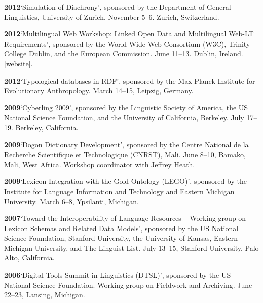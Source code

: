 \documentclass[11pt]{article}
\newcommand{\hangpara}{
 \setlength{\parindent}{0in} %
 \hangindent=0.42in %
}
\begin{document}
\vskip 6pt
\hangpara
{\bf 2012}\hspace{1ex}`Simulation of Diachrony', sponsored by the Department of General Linguistics, University of Zurich. November 5--6. Zurich, Switzerland.

\vskip 6pt
\hangpara
{\bf 2012}\hspace{1ex}`Multilingual Web Workshop: Linked Open Data and Multilingual Web-LT Requirements', sponsored by the World Wide Web Consortium (W3C), Trinity College Dublin, and the European Commission. June 11--13. Dublin, Ireland. \href{https://www.multilingualweb.eu/documents/dublin-workshop/dublin-cfp}{[website]}.

\vskip 6pt
\hangpara
{\bf 2012}\hspace{1ex}`Typological databases in RDF', sponsored by the Max Planck Institute for Evolutionary Anthropology. March 14--15, Leipzig, Germany. 

\vskip 6pt
\hangpara
{\bf 2009}\hspace{1ex}`Cyberling 2009', sponsored by the Linguistic Society of America, the US National Science Foundation, and the University of California, Berkeley. July 17--19. Berkeley, California.

\vskip 6pt
\hangpara
{\bf 2009}\hspace{1ex}`Dogon Dictionary Development', sponsored by the Centre National de la Recherche Scientifique et Technologique (CNRST), Mali. June 8--10, Bamako, Mali, West Africa. Workshop coordinator with Jeffrey Heath.

\vskip 6pt
\hangpara
{\bf 2009}\hspace{1ex}`Lexicon Integration with the Gold Ontology (LEGO)', sponsored by the Institute for Language Information and Technology and Eastern Michigan University. March 6--8, Ypsilanti, Michigan.

\vskip 6pt
\hangpara
{\bf 2007}\hspace{1ex}`Toward the Interoperability of Language Resources -- Working group on Lexicon Schemas and Related Data Models', sponsored by the US National Science Foundation, Stanford University, the University of Kansas, Eastern Michigan University, and The Linguist List. July 13--15, Stanford University, Palo Alto, California.

\vskip 6pt
\hangpara
{\bf 2006}\hspace{1ex}`Digital Tools Summit in Linguistics (DTSL)', sponsored by the US National Science Foundation. Working group on Fieldwork and Archiving. June 22--23, Lansing, Michigan.
\end{document}
